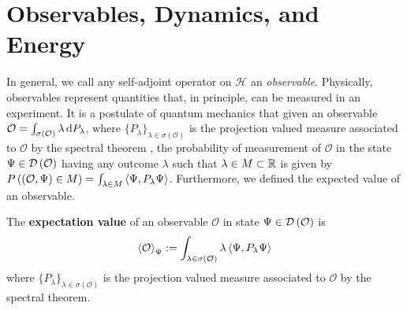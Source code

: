 \section{Observables, Dynamics, and Energy}
In general, we call any self-adjoint operator on $ \mathcal{H} $ an \emph{observable}. Physically, observables represent quantities that, in principle, can be measured in an experiment. It is a postulate of quantum mechanics that given an observable $ \mathcal{O}=\int_{\sigma(\mathcal{O})}\lambda \mathop{}\!\mathrm{d} P_\lambda $, where $\{P_\lambda\}_{\lambda\in\sigma(\mathcal{O})}$ is the projection valued measure associated to $ \mathcal{O} $ by the spectral theorem \cite{reed1981functional}, the probability of measurement of $ \mathcal{O} $ in the state $ \Psi\in\mathcal D\left(\mathcal{O}\right) $ having any outcome $ \lambda $ such that $ \lambda\in M\subset \mathbb{R} $ is given by $ P\left((\mathcal{O},\Psi)\in M\right)=\int_{\lambda\in M} \left\langle\Psi,P_\lambda\Psi\right\rangle $. 
Furthermore, we defined the expected value of an observable.
\begin{definition}
	The \textbf{expectation value} of an observable $ \mathcal{O} $ in state $ \Psi\in\mathcal D\left(\mathcal{O}\right) $ is 
	$$ \left\langle\mathcal{O}\right\rangle_\Psi:=\int_{\lambda\in\sigma(\mathcal{O})}\lambda\left\langle\Psi,P_\lambda\Psi\right\rangle $$
	where $\{P_\lambda\}_{\lambda\in\sigma(\mathcal{O})}$ is the projection valued measure associated to $ \mathcal{O} $ by the spectral theorem.
\end{definition}


